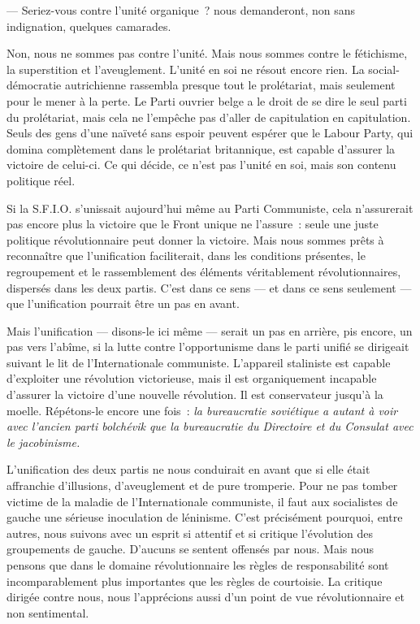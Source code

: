 \documentclass[french,twoside]{book} %
\begin{document}
— Seriez-vous contre l’unité organique ? nous demanderont, non sans indignation, quelques camarades.\par
Non, nous ne sommes pas contre l’unité. Mais nous sommes contre le fétichisme, la superstition et l’aveuglement. L’unité en soi ne résout encore rien. La social-démocratie autrichienne rassembla presque tout le prolétariat, mais seulement pour le mener à la perte. Le Parti ouvrier belge a le droit de se dire le seul parti du prolétariat, mais cela ne l’empêche pas d’aller de capitulation en capitulation. Seuls des gens d’une naïveté sans espoir peuvent espérer que le Labour Party, qui domina complètement dans le prolétariat britannique, est capable d’assurer la victoire de celui-ci. Ce qui décide, ce  n’est pas l’unité en soi, mais son contenu politique réel.\par
Si la S.F.I.O. s’unissait aujourd’hui même au Parti Communiste, cela n’assurerait pas encore plus la victoire que le Front unique ne l’assure : seule une juste politique révolutionnaire peut donner la victoire. Mais nous sommes prêts à reconnaître que l’unification faciliterait, dans les conditions présentes, le regroupement et le rassemblement des éléments véritablement révolutionnaires, dispersés dans les deux partis. C’est dans ce sens — et dans ce sens seulement — que l’unification pourrait être un pas en avant.\par
Mais l’unification — disons-le ici même — serait un pas en arrière, pis encore, un pas vers l’abîme, si la lutte contre l’opportunisme dans le parti unifié se dirigeait suivant le lit de l’Internationale communiste. L’appareil staliniste est capable d’exploiter une révolution victorieuse, mais il est organiquement incapable d’assurer la victoire d’une nouvelle révolution. Il est conservateur jusqu’à la moelle. Répétons-le encore une fois : \emph{la bureaucratie soviétique a autant à voir avec l’ancien parti bolchévik que la bureaucratie du Directoire et du Consulat avec le jacobinisme.}\par
L’unification des deux partis ne nous conduirait en avant que si elle était affranchie d’illusions, d’aveuglement et de pure tromperie. Pour ne pas tomber victime de la maladie de l’Internationale communiste, il faut aux socialistes de gauche une sérieuse inoculation de léninisme. C’est précisément pourquoi, entre autres, nous suivons avec un esprit si attentif et si critique l’évolution des groupements de gauche. D’aucuns se sentent offensés par nous. Mais nous pensons que dans le domaine révolutionnaire les règles de responsabilité sont incomparablement plus importantes que les règles de courtoisie. La critique dirigée contre nous, nous l’apprécions aussi d’un point de vue révolutionnaire et non sentimental.
\end{document}
